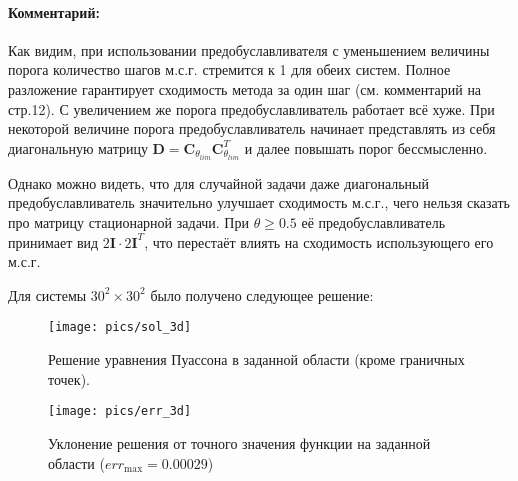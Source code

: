 \paragraph{Комментарий:} Как видим, при использовании предобуславливателя с уменьшением величины порога количество шагов м.с.г. стремится к 1 для обеих систем. Полное разложение гарантирует сходимость метода за один шаг (см. комментарий на стр.12). С увеличением же порога предобуславливатель работает всё хуже. При некоторой величине порога предобуславливатель начинает представлять из себя диагональную матрицу $\mathbf{D} = \mathbf{C}_{\theta_{lim}} \mathbf{C}^T_{\theta_{lim}}$ и далее повышать порог бессмысленно.

Однако можно видеть, что для случайной задачи даже диагональный предобуславливатель значительно улучшает сходимость м.с.г., чего нельзя сказать про матрицу стационарной задачи. При $\theta\ge 0.5$ её предобуславливатель принимает вид $2\mathbf{I}\cdot2\mathbf{I}^T$, что перестаёт влиять на сходимость использующего его м.с.г.

\clearpage
Для системы $30^2\times30^2$ было получено следующее решение:
\begin{figure}[H]
    \centering
    \texttt{[image: pics/sol\_3d]}
    \caption{Решение уравнения Пуассона в заданной области (кроме граничных точек).}
\end{figure}
\begin{figure}[H]
    \centering
    \texttt{[image: pics/err\_3d]}
    \caption{Уклонение решения от точного значения функции на заданной области ($err_{\max}=0.00029$)}
\end{figure}